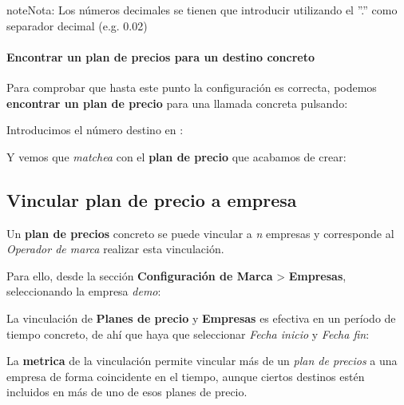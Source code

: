 \documentclass[letterpaper,10pt,spanish]{sphinxmanual}
\begin{document}
\begin{notice}{note}{Nota:}
Los números decimales se tienen que introducir utilizando el ''.'' como separador decimal (e.g. 0.02)
\end{notice}
\paragraph{Encontrar un plan de precios para un destino concreto}

Para comprobar que hasta este punto la configuración es correcta, podemos \textbf{encontrar un plan de precio} para una llamada concreta pulsando:

\noindent{}

Introducimos el número destino en {\hyperref[external_incoming_calls/numeric_transformations:e164]{}}:

\noindent{}

Y vemos que \emph{matchea} con el \textbf{plan de precio} que acabamos de crear:

\noindent{}


\subsection{Vincular plan de precio a empresa}
\label{external_outgoing_calls/noplan_nocall:assigning-a-pricing-plan-to-a-company}\label{external_outgoing_calls/noplan_nocall:pricing-plan-to-company}
Un \textbf{plan de precios} concreto se puede vincular a \emph{n} empresas y corresponde al \emph{Operador de marca} realizar esta vinculación.

Para ello, desde la sección \textbf{Configuración de Marca} \textgreater{} \textbf{Empresas}, seleccionando la empresa \emph{demo}:

\noindent{}

La vinculación de \textbf{Planes de precio} y \textbf{Empresas} es efectiva en un período de tiempo concreto, de ahí que haya que seleccionar \emph{Fecha inicio} y \emph{Fecha fin}:

\noindent{}

La \textbf{metrica} de la vinculación permite vincular más de un \emph{plan de precios} a una empresa de forma coincidente en el tiempo, aunque ciertos destinos estén incluidos en más de uno de esos planes de precio.
\end{document}
